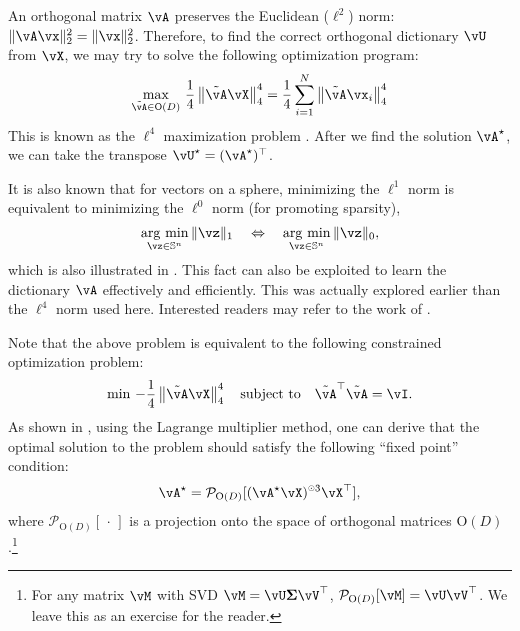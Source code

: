 \documentclass[../../book-main.tex]{subfiles}
\begin{document}
An orthogonal matrix $\vA$ preserves the Euclidean (\(\ell^{2}\)) norm: $\|\vA \vx\|_2^2 = \|\vx\|_2^2$. Therefore, to find the correct orthogonal dictionary $\vU$ from $\vX$, we may try to solve the following optimization program:
\begin{equation}\label{eq0:orthogonal-dictionary-learning-l4}
    \max_{\tilde{\vA} \in \O(D)}\,
     \frac{1}{4} \norm*{
    \tilde{\vA} \vX
    }_4^4 =  \frac{1}{4} \sum_{i=1}^N \norm*{
        \tilde{\vA} \vx_i
    }_4^4
\end{equation}
This is known as the $\ell^4$ maximization problem \cite{Zhai-2020}. After we
find the solution \(\vA^{\star}\), we can take the transpose \(\vU^{\star}
= (\vA^{\star})^{\top}\).
\begin{remark}
    It is also known that for vectors on a sphere, minimizing the $\ell^1$ norm is equivalent to minimizing the $\ell^0$ norm (for promoting sparsity),
\begin{equation*}
            \argmin_{\vz \in \mathbb{S}^n}\|\vz\|_{1}\quad\Leftrightarrow\quad \argmin_{\vz \in \mathbb{S}^n}\|\vz\|_{0},
\end{equation*}
which is also illustrated in . This fact can also be exploited to learn the dictionary $\vA$ effectively and efficiently. This was actually explored earlier than the $\ell^4$ norm used here. Interested readers may refer to the work of \cite{qu2020findingsparsestvectorssubspace}.
\end{remark}

Note that the above problem is equivalent to the following constrained optimization problem:
\begin{equation}\label{eq:orthogonal-dictionary-learning-l4}
    \min\,
    -   \frac{1}{4} \norm*{
    \tilde{\vA} \vX
    }_4^4 \quad \mbox{subject to} \quad  \tilde{\vA}^\top\tilde{\vA} = \vI.
\end{equation}
As shown in \cite{Wright-Ma-2022}, using the Lagrange multiplier method, one can derive that the optimal solution to the problem should satisfy the following 
``fixed point'' condition:
\begin{equation}
    \vA^{\star} = \mathcal{P}_{\mathrm O(D)}[( {\vA^{\star} \vX})^{\hada 3}\vX^\top],
\end{equation}
where $\mathcal{P}_{\mathrm O(D)}[\,\cdot\,]$ is a projection onto the space of
orthogonal matrices $\mathrm O(D)$.\footnote{For any matrix $\vM$ with SVD $\vM = \vU\bm \Sigma \vV^\top$, $\mathcal{P}_{\mathrm O(D)}[\vM] = \vU \vV^\top$. We leave this as an exercise for the reader.} 
\end{document}
